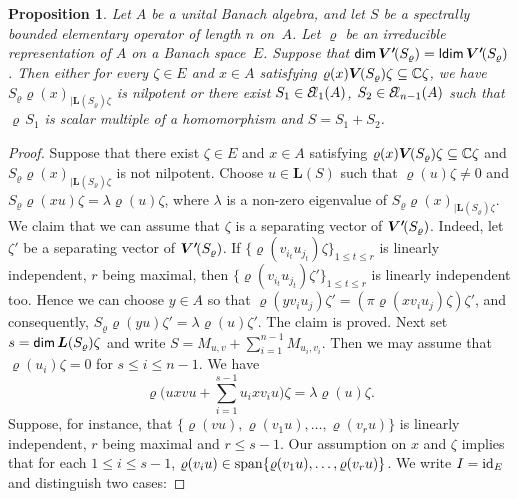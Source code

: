 \documentclass[a4paper,12pt,reqno]{amsart}
\numberwithin{equation}{section}
\newtheorem{prop}[thm]{Proposition}
\theoremstyle{definition}
\begin{document}
\begin{prop}\label{spb-notqu}
Let $A$ be a unital Banach algebra, and let $S$ be  a spectrally bounded elementary operator of length $n$ on~$A$.
Let $\varrho$ be an irreducible representation of $A$ on a Banach space~$E$.
Suppose that ${{\sf dim}\,}{{\bm{V'}\mkern-2.5mu(S_\varrho)}}= {{\sf ldim}\,}{{\bm{V'}\mkern-2.5mu(S_\varrho)}}$. Then either for every $\zeta \in E$ and $x \in A$ satisfying
$\varrho(x){{\bm V\mkern-2.5mu(S_\varrho)}}\zeta \subseteq \mathbb C \zeta$,  we have\/ $S_\varrho\varrho(x)_{|{{\bm L(S_\varrho)}}\zeta}$ is nilpotent
or there exist ${S}_1 \in {{\mathcal{E}\kern-2.6pt\ell}}_{1} (A)$, ${S}_2 \in {{\mathcal{E}\kern-2.6pt\ell}}_{n-1} (A)$  such that $\varrho\,{S}_1$ is scalar multiple of a
homomorphism and ${S}= {S}_1+ {S}_2$.
\end{prop}
\begin{proof}
Suppose that there exist $\zeta\in E$ and $x\in A$ satisfying $\varrho(x){{\bm V\mkern-2.5mu(S_\varrho)}}\zeta \subseteq\mathbb C \zeta$ and
$S_\varrho\varrho(x)_{|{{\bm L(S_\varrho)}}\zeta}$ is not nilpotent.  Choose $u\in{{\bm L(S)}}$ such that $\varrho(u)\zeta\neq 0$ and
$S_\varrho\varrho(xu)\zeta= \lambda\varrho(u )\zeta$, where $\lambda$ is a non-zero eigenvalue of
$S_\varrho\varrho(x)_{|{{\bm L(S_\varrho)}}\zeta}$. We claim that  we can assume that $\zeta$ is a separating vector of ${{\bm{V'}\mkern-2.5mu(S_\varrho)}}$.
Indeed, let $\zeta'$ be a separating vector of ${{\bm{V'}\mkern-2.5mu(S_\varrho)}}$. If $\{\varrho (v_{i_t}u_{j_t}) \zeta\}_{1 \leq t \leq r}$ is
linearly independent, $r$ being maximal, then $\{\varrho (v_{i_t}u_{j_t}) \zeta' \}_{1 \leq t \leq r}$ is linearly independent too.
Hence we can choose $y\in A$ so that $\varrho (y v_iu_j) \zeta'= (\pi \varrho (x v_i u_j) \zeta) \zeta'$, and consequently,
$S_\varrho\varrho(yu) \zeta'= \lambda \varrho (u) \zeta'$. The claim is proved.
Next set $s= {{\sf dim}\,}{{\bm L(S_\varrho)}}\zeta$ and write $S=M_{u,v}+ \sum_{i=1}^{n-1} M_{u_i,v_i}$.
Then we may assume that $\varrho (u_i) \zeta=0$ for $s \leq i \leq n-1$. We have
\begin{equation*}
\varrho \bigl(uxvu  +\sum_{i=1}^{s-1} u_i xv_iu\bigr) \zeta = \lambda \varrho (u) \zeta.
\end{equation*}
Suppose, for instance,  that $\{\varrho (vu), \varrho (v_1 u), \ldots, \varrho (v_r u) \}$ is linearly independent,
$r$ being maximal and $r \leq s-1$. Our assumption on $x$ and $\zeta$ implies that for each
$1 \leq i \leq s-1$, $\varrho (v_i u) \in {{\rm span}} \{\varrho (v_1 u), \ldots, \varrho (v_r u) \}$.
We write $I=\textup{id}_E$ and distinguish two cases:


\end{proof}
\end{document}
